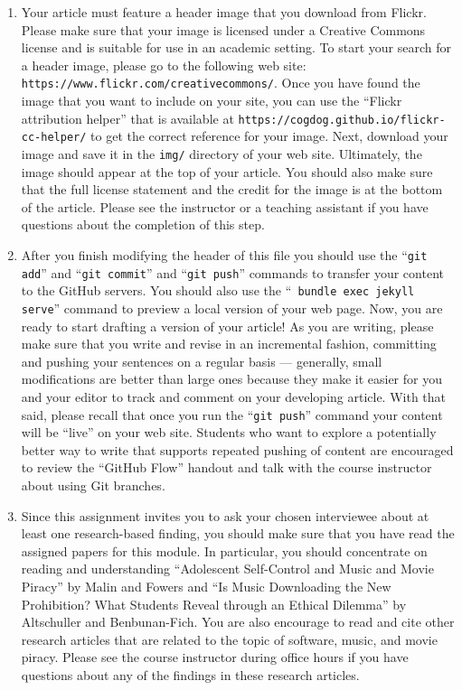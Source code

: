 \begin{enumerate}
  \item Your article must feature a header image that you download from Flickr. Please make sure that your image is
    licensed under a Creative Commons license and is suitable for use in an academic setting. To start your search for a
    header image, please go to the following web site: {\tt https://www.flickr.com/creativecommons/}. Once you have
    found the image that you want to include on your site, you can use the ``Flickr attribution helper'' that is
    available at {\tt https://cogdog.github.io/flickr-cc-helper/} to get the correct reference for your image. Next,
    download your image and save it in the {\tt img/} directory of your web site. Ultimately, the image should appear at
    the top of your article. You should also make sure that the full license statement and the credit for the image is
    at the bottom of the article. Please see the instructor or a teaching assistant if you have questions about the
    completion of this step.

  \item After you finish modifying the header of this file you should use the ``{\tt git add}'' and ``{\tt git commit}''
    and ``{\tt git push}'' commands to transfer your content to the GitHub servers. You should also use the ``{\tt
    bundle exec jekyll serve}'' command to preview a local version of your web page. Now, you are ready to start
    drafting a version of your article! As you are writing, please make sure that you write and revise in an incremental
    fashion, committing and pushing your sentences on a regular basis --- generally, small modifications are better than
    large ones because they make it easier for you and your editor to track and comment on your developing article. With
    that said, please recall that once you run the ``{\tt git push}'' command your content will be ``live'' on your web
    site. Students who want to explore a potentially better way to write that supports repeated pushing of content are
    encouraged to review the ``GitHub Flow'' handout and talk with the course instructor about using Git branches.

  \item Since this assignment invites you to ask your chosen interviewee about at least one research-based finding, you
    should make sure that you have read the assigned papers for this module. In particular, you should concentrate on
    reading and understanding ``Adolescent Self-Control and Music and Movie Piracy'' by Malin and Fowers and ``Is Music
    Downloading the New Prohibition? What Students Reveal through an Ethical Dilemma'' by Altschuller and Benbunan-Fich.
    You are also encourage to read and cite other research articles that are related to the topic of software, music,
    and movie piracy. Please see the course instructor during office hours if you have questions about any of the
    findings in these research articles.


\end{enumerate}

